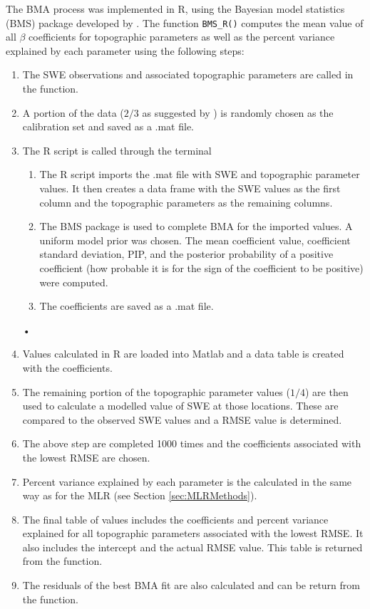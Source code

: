 \documentclass[12pt]{article}
\begin{document}
The BMA process was implemented in R, using the Bayesian model statistics (BMS) package developed by \cite{Zeugner2015}. The function \texttt{BMS\_R()} computes the mean value of all $\beta$ coefficients for topographic parameters as well as the percent variance explained by each parameter using the following steps:
\begin{enumerate}
\item The SWE observations and associated topographic parameters are called in the function.
\item A portion of the data ($2/3$ as suggested by \cite{Kohavi1995}) is randomly chosen as the calibration set and saved as a .mat file. 
\item The R script is called through the terminal
	\begin{enumerate}
		\item The R script imports the .mat file with SWE and topographic parameter values. It then creates a data 				frame with the SWE values as the first column and the topographic parameters as the remaining 					columns. 
		\item The BMS package is used to complete BMA for the imported values. A uniform model prior was chosen. 				The mean coefficient value, coefficient standard deviation, PIP, and the posterior probability of a positive 			coefficient (how probable it is for the sign of the coefficient to be positive) were computed.
		\item The coefficients are saved as a .mat file.
	\end{enumerate}•
\item Values calculated in R are loaded into Matlab and a data table is created with the coefficients.
\item The remaining portion of the topographic parameter values ($1/4$) are then used to calculate a modelled value of 		SWE at those locations. These are compared to the observed SWE values and a RMSE value is determined.
\item The above step are completed 1000 times and the coefficients associated with the lowest RMSE are chosen.
\item Percent variance explained by each parameter is the calculated in the same way as for the MLR (see Section 			\ref{sec:MLRMethods}). 
\item The final table of values includes the coefficients and percent variance explained for all topographic parameters associated with the lowest RMSE. It also includes the intercept and the actual RMSE value. This table is returned from the function.
\item The residuals of the best BMA fit are also calculated and can be return from the function.  
\end{enumerate}
\end{document}
